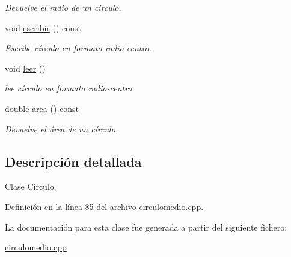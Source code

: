 \begin{DoxyCompactItemize}
\begin{DoxyCompactList}\small\item\em Devuelve el radio de un circulo. \end{DoxyCompactList}\item 
void \hyperlink{classCirculo_a2deaed49ea394702beb0554f9480137e}{escribir} () const \hypertarget{classCirculo_a2deaed49ea394702beb0554f9480137e}{}\label{classCirculo_a2deaed49ea394702beb0554f9480137e}

\begin{DoxyCompactList}\small\item\em Escribe círculo en formato radio-\/centro. \end{DoxyCompactList}\item 
void \hyperlink{classCirculo_aa71efffb3b42eeaefd43743a8d34aa74}{leer} ()\hypertarget{classCirculo_aa71efffb3b42eeaefd43743a8d34aa74}{}\label{classCirculo_aa71efffb3b42eeaefd43743a8d34aa74}

\begin{DoxyCompactList}\small\item\em lee círculo en formato radio-\/centro \end{DoxyCompactList}\item 
double \hyperlink{classCirculo_a532d4f2bd03b688403c4370319411dc3}{area} () const \hypertarget{classCirculo_a532d4f2bd03b688403c4370319411dc3}{}\label{classCirculo_a532d4f2bd03b688403c4370319411dc3}

\begin{DoxyCompactList}\small\item\em Devuelve el área de un círculo. \end{DoxyCompactList}\end{DoxyCompactItemize}


\subsection{Descripción detallada}
Clase Círculo. 

Definición en la línea 85 del archivo circulomedio.\+cpp.



La documentación para esta clase fue generada a partir del siguiente fichero\+:\begin{DoxyCompactItemize}
\item 
\hyperlink{circulomedio_8cpp}{circulomedio.\+cpp}\end{DoxyCompactItemize}
